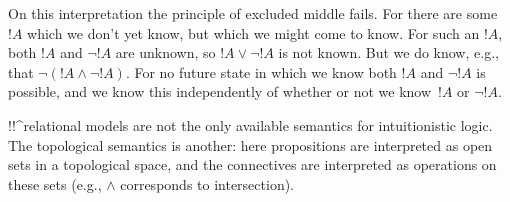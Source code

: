 \documentclass[../../../include/open-logic-section]{subfiles}
\begin{document}
On this interpretation the principle of excluded middle fails. For
there are some $!A$ which we don't yet know, but which we might come
to know. For such an $!A$, both $!A$ and $\lnot !A$ are unknown, so
$!A \lor \lnot !A$ is not known. But we do know, e.g., that $\lnot(!A
\land \lnot !A)$. For no future state in which we know both $!A$ and
$\lnot !A$ is possible, and we know this independently of whether or
not we know~$!A$ or $\lnot !A$.

!!^{relational model}s are not the only available semantics for
intuitionistic logic. The topological semantics is another: here
propositions are interpreted as open sets in a topological space, and
the connectives are interpreted as operations on these sets (e.g.,
$\land$ corresponds to intersection).
\end{document}
